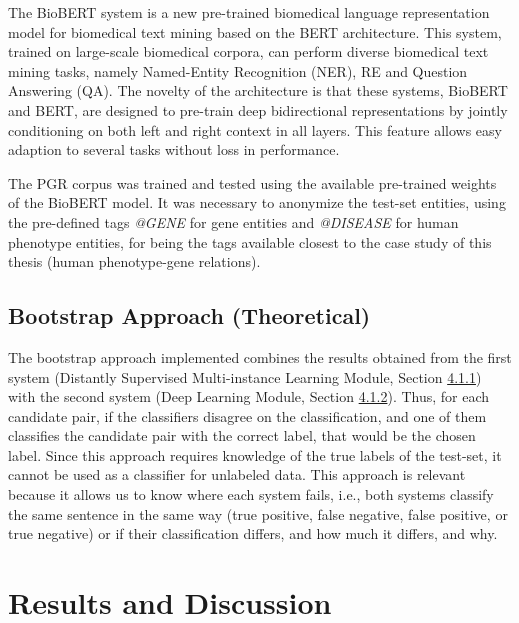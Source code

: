 The BioBERT system is a new pre-trained biomedical language representation model for biomedical text mining based on the BERT \citep{BERT} architecture. This system, trained on large-scale biomedical corpora, can perform diverse biomedical text mining tasks, namely Named-Entity Recognition (NER), RE and Question Answering (QA). The novelty of the architecture is that these systems, BioBERT and BERT, are designed to pre-train deep bidirectional representations by jointly conditioning on both left and right context in all layers. This feature allows easy adaption to several tasks without loss in performance.

The PGR corpus was trained and tested using the available pre-trained weights of the BioBERT model. It was necessary to anonymize the test-set entities, using the pre-defined tags \textit{@GENE} for gene entities and \textit{@DISEASE} for human phenotype entities, for being the tags available closest to the case study of this thesis (human phenotype-gene relations).


\subsection{Bootstrap Approach (Theoretical)}

The bootstrap approach implemented combines the results obtained from the first system (Distantly Supervised Multi-instance Learning Module, Section \hyperlink{4.1.1}{4.1.1}) with the second system (Deep Learning Module, Section \hyperlink{4.1.2}{4.1.2}). Thus, for each candidate pair, if the classifiers disagree on the classification, and one of them classifies the candidate pair with the correct label, that would be the chosen label. Since this approach requires knowledge of the true labels of the test-set, it cannot be used as a classifier for unlabeled data. This approach is relevant because it allows us to know where each system fails, i.e., both systems classify the same sentence in the same way (true positive, false negative, false positive, or true negative) or if their classification differs, and how much it differs, and why.



\section{Results and Discussion}

